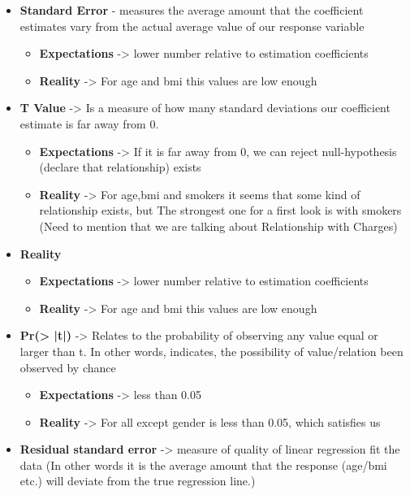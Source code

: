 \documentclass{article}
\begin{document}
\begin{itemize}
  \item \textbf{Standard Error} - measures the average amount 
  that the coefficient estimates vary from the actual average value of our response variable
  \begin{itemize}
    \item \textbf{Expectations} -> lower number relative to estimation coefficients
    \item \textbf{Reality} -> For age and bmi this values are low enough
  \end{itemize}
  \item \textbf{T Value} -> Is a measure of how many standard deviations our coefficient estimate is far away from 0.
  \begin{itemize}
    \item \textbf{Expectations} -> If it is far away from 0, we can reject null-hypothesis (declare that relationship)
    exists
    \item \textbf{Reality} -> For age,bmi and smokers it seems that some kind of relationship exists, but
    The strongest one for a first look is with smokers (Need to mention that we are talking about
    Relationship with Charges)
  \end{itemize}
    \item \textbf{Reality}
  \begin{itemize}
    \item \textbf{Expectations} -> lower number relative to estimation coefficients
    \item \textbf{Reality} -> For age and bmi this values are low enough
  \end{itemize}
  \item \textbf{Pr(> |t|) } -> Relates to the probability of observing any value equal or larger than t.
  In other words, indicates, the possibility of value/relation been observed by chance
  \begin{itemize}
    \item \textbf{Expectations} -> less than 0.05
    \item \textbf{Reality} -> For all except gender is less than 0.05, which satisfies us
  \end{itemize}
    \item \textbf{Residual standard error} -> measure of quality of linear regression fit the data (In other words it is the average amount that the response (age/bmi etc.) will deviate from the true regression line.)
  \begin{itemize}

\end{itemize}
\end{itemize}
\end{document}
